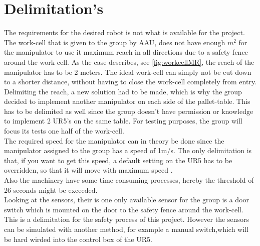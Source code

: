 \section{Delimitation's} \label{ch:Delimitations}

The requirements for the desired robot is not what is available for the project. 
The work-cell that is given to the group by AAU, does not have enough $m^2$ for the manipulator to use it maximum reach in all directions due to a safety fence around the work-cell. As the case describes, see \ref{fig:workcellMR}, the reach of the manipulator has to be 2 meters. The ideal work-cell can simply not be cut down to a shorter distance, without having to close the work-cell completely from entry.\\
Delimiting the reach, a new solution had to be made, which is why the group decided to implement another manipulator on each side of the pallet-table. This has to be delimited as well since the group doesn't have permission or knowledge to implement 2 UR5's on the same table.
For testing purposes, the group will focus its tests one half of the work-cell. \\
The required speed for the manipulator can in theory be done since the manipulator assigned to the group has a speed of 1m/s. The only delimitation is that, if you want to get this speed, a default setting on the UR5 has to be overridden, so that it will move with maximum speed \cite{UserManual}.\\
Also the machinery have some time-consuming processes, hereby the threshold of 26 seconds might be exceeded.\\
Looking at the sensors, their  is one only available sensor for the group is a door switch which is mounted on the door to the safety fence around the work-cell. This is a delimitation for the safety process of this project. However the sensors can be simulated with another method, for example a manual switch,which will be hard wirded into the control box of the UR5.\\
